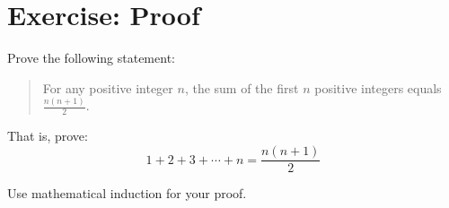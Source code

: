 \documentclass{article}
\begin{document}
\section*{Exercise: Proof}

Prove the following statement:

\begin{quote}
For any positive integer $n$, the sum of the first $n$ positive integers equals $\frac{n(n+1)}{2}$.
\end{quote}

That is, prove:
$$1 + 2 + 3 + \cdots + n = \frac{n(n+1)}{2}$$

Use mathematical induction for your proof.
\end{document}
